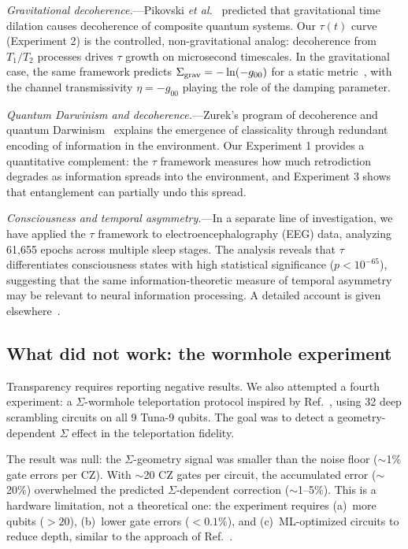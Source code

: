 \documentclass[prl,twocolumn,superscriptaddress,longbibliography,floatfix]{revtex4-2}
\newcommand{\tauasym}{\tau}
\begin{document}
\textit{Gravitational decoherence.}---Pikovski
\textit{et al.}~\cite{Pikovski2015} predicted that gravitational
time dilation causes decoherence of composite quantum systems.
Our $\tauasym(t)$ curve (Experiment 2) is the controlled,
non-gravitational analog: decoherence from $T_1/T_2$ processes
drives $\tauasym$ growth on microsecond timescales.  In the
gravitational case, the same framework predicts
$\Sigma_{\rm grav} = -\ln(-g_{00})$ for a static
metric~\cite{Huang2026b}, with the channel transmissivity
$\eta = -g_{00}$ playing the role of the damping parameter.

\textit{Quantum Darwinism and decoherence.}---Zurek's program of
decoherence and quantum Darwinism~\cite{Zurek2003} explains the
emergence of classicality through redundant encoding of information
in the environment.  Our Experiment 1 provides a quantitative
complement: the $\tauasym$ framework measures how much retrodiction
degrades as information spreads into the environment, and
Experiment 3 shows that entanglement can partially undo this spread.

\textit{Consciousness and temporal asymmetry.}---In a separate line
of investigation, we have applied the $\tauasym$ framework to
electroencephalography (EEG) data, analyzing 61,655 epochs across
multiple sleep stages.  The analysis reveals that $\tauasym$
differentiates consciousness states with high statistical
significance ($p < 10^{-65}$), suggesting that the same
information-theoretic measure of temporal asymmetry may be relevant
to neural information processing.  A detailed account is given
elsewhere~\cite{Huang2026c}.

\subsection{What did not work: the wormhole experiment}

Transparency requires reporting negative results.  We also
attempted a fourth experiment: a $\Sigma$-wormhole teleportation
protocol inspired by Ref.~\cite{Jafferis2022}, using 32 deep
scrambling circuits on all 9 Tuna-9 qubits.  The goal was to
detect a geometry-dependent $\Sigma$ effect in the teleportation
fidelity.

The result was null: the $\Sigma$-geometry signal was smaller than
the noise floor ($\sim$1\% gate errors per CZ).  With $\sim$20 CZ
gates per circuit, the accumulated error ($\sim$20\%) overwhelmed
the predicted $\Sigma$-dependent correction ($\sim$1--5\%).
This is a hardware limitation, not a theoretical one: the
experiment requires (a)~more qubits ($>20$), (b)~lower gate errors
($<0.1\%$), and (c)~ML-optimized circuits to reduce depth, similar
to the approach of Ref.~\cite{Jafferis2022}.
\end{document}
